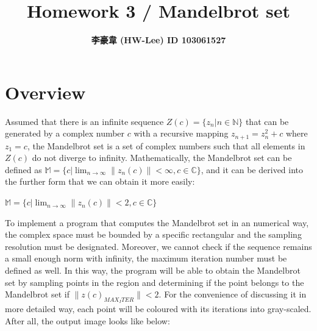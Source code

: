 \documentclass[12pt]{article}
\title{\textbf{ Homework 3 / Mandelbrot set }}
\author{\textbf{李豪韋 (HW-Lee) ID 103061527}}
\date{}
\begin{document}
\vspace*{-60pt}
{\let\newpage\relax\maketitle}
\thispagestyle{title}

\section*{Overview}
\vspace{-20pt}
\noindent\makebox[\linewidth]{\rule{\textwidth}{0.4pt}}
\vspace{5pt}

Assumed that there is an infinite sequence $Z(c) = \{z_n|n \in \mathbb{N}\}$ that can be generated by a complex number $c$ with a recursive mapping $z_{n+1} = z_n^2 + c$ where $z_1 = c$, the Mandelbrot set is a set of complex numbers such that all elements in $Z(c)$ do not diverge to infinity. Mathematically, the Mandelbrot set can be defined as $\mathbb{M} = \{c|\displaystyle\lim_{n \to \infty}\|z_n(c)\| < \infty , c \in \mathbb{C}\}$, and it can be derived into the further form that we can obtain it more easily:
\begin{center}
    $\mathbb{M} = \{c|\displaystyle\lim_{n \to \infty}\|z_n(c)\| < 2 , c \in \mathbb{C}\}$
\end{center}

To implement a program that computes the Mandelbrot set in an numerical way, the complex space must be bounded by a specific rectangular and the sampling resolution must be designated. Moreover, we cannot check if the sequence remains a small enough norm with infinity, the maximum iteration number must be defined as well. In this way, the program will be able to obtain the Mandelbrot set by sampling points in the region and determining if the point belongs to the Mandelbrot set if $\|z(c)_{MAX_ITER}\| < 2$. For the convenience of discussing it in more detailed way, each point will be coloured with its iterations into gray-scaled. After all, the output image looks like below:
\end{document}
